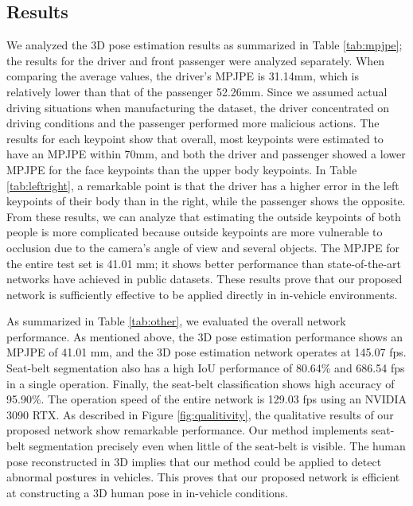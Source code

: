 \documentclass[letterpaper]{article} %
\begin{document}
\subsection{Results}
We analyzed the 3D pose estimation results as summarized in Table \ref{tab:mpjpe}; the results for the driver and front passenger were analyzed separately. When comparing the average values, the driver's MPJPE is 31.14mm, which is relatively lower than that of the passenger 52.26mm. Since we assumed actual driving situations when manufacturing the dataset, the driver concentrated on driving conditions and the passenger performed more malicious actions. The results for each keypoint show that overall, most keypoints were estimated to have an MPJPE within 70mm, and both the driver and passenger showed a lower MPJPE for the face keypoints than the upper body keypoints. In Table \ref{tab:leftright}, a remarkable point is that the driver has a higher error in the left keypoints of their body than in the right, while the passenger shows the opposite. From these results, we can analyze that estimating the outside keypoints of both people is more complicated because outside keypoints are more vulnerable to occlusion due to the camera's angle of view and several objects. The MPJPE for the entire test set is 41.01 mm; it shows better performance than state-of-the-art networks have achieved in public datasets. These results prove that our proposed network is sufficiently effective to be applied directly in in-vehicle environments.

As summarized in Table \ref{tab:other}, we evaluated the overall network performance. As mentioned above, the 3D pose estimation performance shows an MPJPE of 41.01 mm, and the 3D pose estimation network operates at 145.07 fps. Seat-belt segmentation also has a high IoU performance of 80.64\% and 686.54 fps in a single operation. Finally, the seat-belt classification shows high accuracy of 95.90\%. The operation speed of the entire network is 129.03 fps using an NVIDIA 3090 RTX. As described in Figure \ref{fig:qualitivity}, the qualitative results of our proposed network show remarkable performance. Our method implements seat-belt segmentation precisely even when little of the seat-belt is visible. The human pose reconstructed in 3D implies that our method could be applied to detect abnormal postures in vehicles. This proves that our proposed network is efficient at constructing a 3D human pose in in-vehicle conditions.

\vspace{-1.78mm}
\end{document}
